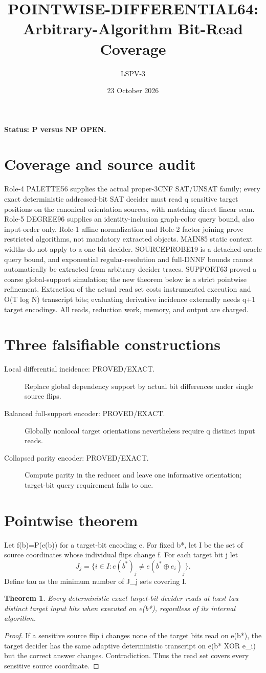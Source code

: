 \documentclass{article}
\title{POINTWISE-DIFFERENTIAL64: Arbitrary-Algorithm Bit-Read Coverage}
\author{LSPV-3}
\date{23 October 2026}
\newtheorem{theorem}{Theorem}
\begin{document}
\maketitle
\noindent\textbf{Status: P versus NP OPEN.}
\section{Coverage and source audit}
Role-4 PALETTE56 supplies the actual proper-3CNF SAT/UNSAT family; every exact deterministic addressed-bit SAT decider must read q sensitive target positions on the canonical orientation sources, with matching direct linear scan. Role-5 DEGREE96 supplies an identity-inclusion graph-color query bound, also input-order only. Role-1 affine normalization and Role-2 factor joining prove restricted algorithms, not mandatory extracted objects. MAIN85 static context widths do not apply to a one-bit decider. SOURCEPROBE19 is a detached oracle query bound, and exponential regular-resolution and full-DNNF bounds cannot automatically be extracted from arbitrary decider traces. SUPPORT63 proved a coarse global-support simulation; the new theorem below is a strict pointwise refinement. Extraction of the actual read set costs instrumented execution and O(T log N) transcript bits; evaluating derivative incidence externally needs q+1 target encodings. All reads, reduction work, memory, and output are charged.
\section{Three falsifiable constructions}
\begin{description}
\item[Local differential incidence: PROVED/EXACT.] Replace global dependency support by actual bit differences under single source flips.
\item[Balanced full-support encoder: PROVED/EXACT.] Globally nonlocal target orientations nevertheless require q distinct input reads.
\item[Collapsed parity encoder: PROVED/EXACT.] Compute parity in the reducer and leave one informative orientation; target-bit query requirement falls to one.
\end{description}
\section{Pointwise theorem}
Let f(b)=P(e(b)) for a target-bit encoding e. For fixed b*, let I be the set of source coordinates whose individual flips change f. For each target bit j let
\[
J_j=\{i\in I:e(b^*)_j\ne e(b^*\oplus e_i)_j\}.
\]
Define tau as the minimum number of J_j sets covering I.
\begin{theorem}
Every deterministic exact target-bit decider reads at least tau distinct target input bits when executed on e(b*), regardless of its internal algorithm.
\end{theorem}
\begin{proof}
If a sensitive source flip i changes none of the target bits read on e(b*), the target decider has the same adaptive deterministic transcript on e(b* XOR e_i) but the correct answer changes. Contradiction. Thus the read set covers every sensitive source coordinate.
\end{proof}
\end{document}
